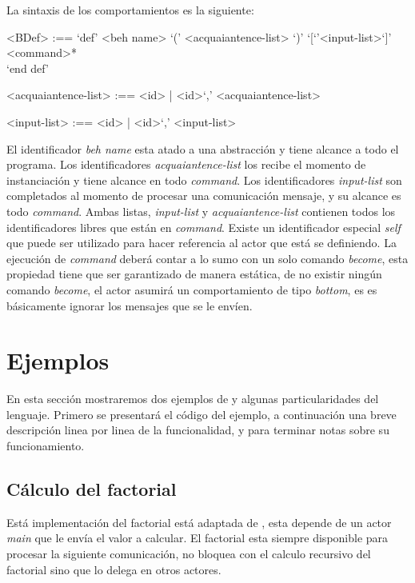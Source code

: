 La sintaxis de los comportamientos es la siguiente:

\begin{grammar}
<BDef> :== `def' <beh name> `(' <acquaiantence-list> `)' `[`'<input-list>`]' \\
\quad \quad <command>*  \\
\quad `end def'
  
<acquaiantence-list> :== <id> | <id>`,' <acquaiantence-list>
  
<input-list> :== <id> | <id>`,' <input-list>
\end{grammar}

El identificador \textit{beh name} esta atado a una abstracción y tiene alcance
a todo el programa. Los identificadores \textit{acquaiantence-list} los recibe el
momento de instanciación y tiene alcance en todo \textit{command}. Los
identificadores \textit{input-list} son completados al momento de procesar una comunicación
mensaje, y su alcance es todo \textit{command}. 
Ambas listas, \textit{input-list} y \textit{acquaiantence-list} contienen todos
los identificadores libres que están en \textit{command}. Existe un
identificador especial \textit{self} que puede ser utilizado para hacer
referencia al actor que está se definiendo. 
La ejecución de \textit{command} deberá contar a lo sumo con un solo comando
\textit{become}, esta propiedad tiene que ser garantizado de manera estática, de no
existir ningún comando \textit{become}, el actor asumirá un comportamiento de
tipo \textit{bottom}, es es básicamente ignorar los mensajes que se le envíen.

\section{Ejemplos}

En esta sección mostraremos dos ejemplos de \SAL y algunas particularidades del lenguaje. Primero se presentará el código del ejemplo, a continuación una breve descripción linea por linea de la funcionalidad,  y para terminar notas sobre su funcionamiento.

\subsection{Cálculo del factorial}

Está implementación del factorial está adaptada de \cite{Agha:1986:AMC:7929}, esta
depende de un actor \textit{main} que le envía el valor a calcular. El factorial
esta siempre disponible para procesar la siguiente comunicación, no bloquea con
el calculo recursivo del factorial sino que lo delega en otros actores.

